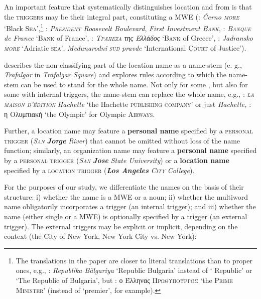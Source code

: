 \documentclass[output=paper]{langsci/langscibook}
\newcommand{\trigger}[1]{\textsc{#1}}
\begin{document}
An important feature that systematically distinguishes location and
 from  is that the \trigger{triggers} may
be their integral part, constituting a MWE (:
\textit{Černo \trigger{more}} `Black \trigger{Sea}’,\footnote{The translations in the paper are closer to literal translations than to proper ones, e.g., : \textit{Republika Bălgariya} ‘Republic Bulgaria’ instead of ` Republic' or `The Republic of Bulgaria', but : ο Έλληνας \trigger{Πρωθυπουργός}  `the  \trigger{Prime Minister'} (instead of `premier',
for example).}
: \textit{\trigger{President} Roosevelt Boulevard}, \textit{First Investment \trigger{Bank}},
: \textit{\trigger{Banque} de France} ‘\trigger{Bank} of France’, 
: \textit{\trigger{Τράπεζα} της Ελλάδος} ‘\trigger{Bank} of Greece’, 
: \textit{Jadransko \trigger{more}} ‘Adriatic \trigger{sea}’, \textit{Međunarodni} \textit{\trigger{sud}}
\textit{pravde} ‘International \trigger{Court} of Justice’).



\cite{carroll1985} describes the non-classifying part of the location name
as a name-stem (e. g., \textit{Trafalgar} in \textit{Trafalgar Square})
and explores rules according to which the name-stem can be used to
stand for the whole name. Not only for some , but also
for some  with internal triggers, the name-stem can
replace the whole name, e.g., : \textit{\trigger{la maison d’édition}}
\textit{Hachette} ‘the Hachette \trigger{publishing company}’ or just
\textit{Hachette, }: η Ολυμπιακή ‘the Olympic’ for Olympic
\trigger{Airways}.

Further, a  location name may feature a \textbf{personal name} specified
by a \trigger{personal} \trigger{trigger} (\textit{\trigger{San}}
\textbf{\textit{Jorge}} \textit{River}) that cannot be omitted without
loss of the name function; similarly, an organization name may feature
a \textbf{personal name} specified by a \trigger{personal trigger}
(\textit{\trigger{San}} \textbf{\textit{Jose}} \textit{State University})
or a \textbf{location name} specified by a \trigger{location trigger}
(\textbf{\textit{Los Angeles}} \textit{\trigger{City}} \textit{College}).

For the purposes of our study, we differentiate the names on the basis
of their structure: i) whether the name is a MWE or a noun; ii) whether
the multiword name obligatorily incorporates a trigger (an internal
trigger); and iii) whether the name (either single or a MWE) is
optionally specified by a trigger (an external trigger). The external
triggers may be explicit or implicit, depending on the context (the
City of New York, New York City vs. New York):
\end{document}
